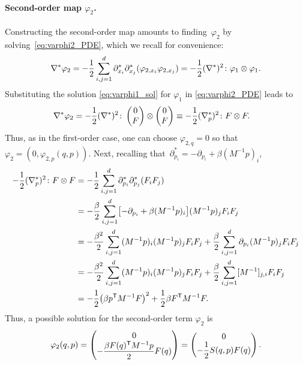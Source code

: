 \documentclass[11pt]{article}
\renewcommand{\t}{\mathsf T}
\DeclarePairedDelimiter\paren{\lparen}{\rparen}
\DeclarePairedDelimiter\bkt{\lbrack}{\rbrack}
\theoremstyle{definition}
\let\oldparagraph=\paragraph
\renewcommand\paragraph[1]{\oldparagraph{#1.}}
\begin{document}
\paragraph{Second-order map $\varphi_2$} Constructing the second-order map amounts to finding~$\varphi_2$ by solving~\eqref{eq:varphi2_PDE}, which we recall for convenience:
\begin{equation}
    \notag
	\nabla^*\varphi_2 = -\frac{1}{2}\sum_{i,j=1}^d \partial_{x_i}^*\partial_{x_j}^* (\varphi_{2,x_i}\varphi_{2,x_j}) = -\frac{1}{2}(\nabla^*)^2 \colon \varphi_1\otimes \varphi_1.
\end{equation}
Substituting the solution \eqref{eq:varphi1_sol} for $\varphi_1$ in \eqref{eq:varphi2_PDE} leads to
\begin{align}
    \notag
    \nabla^*\varphi_2 &= -\frac{1}{2}(\nabla^*)^2\colon 
    \begin{pmatrix}
        0 \\ F    
    \end{pmatrix} \otimes 
    \begin{pmatrix}
        0 \\ F    
    \end{pmatrix} \equiv -\frac{1}{2}(\nabla_p^*)^2 \colon F\otimes F.
\end{align}
Thus, as in the first-order case, one can choose $\varphi_{2,q} = 0$ so that $\varphi_2 = (0, \varphi_{2,p}(q,p))$. Next, recalling that~$\partial^*_{p_i} = -\partial_{p_i} + \beta (M^{-1}p)_i$,
\begin{align*}
    -\frac{1}{2}(\nabla_p^*)^2 \colon F\otimes F &= -\frac{1}{2}\sum_{i,j=1}^d \partial_{p_i}^*\partial_{p_j}^* \paren*{F_i F_j} \\
    &= -\frac{\beta}{2}\sum_{i,j=1}^d \bkt*{-\partial_{p_i} + \beta (M^{-1}p)_i}(M^{-1}p)_j F_i F_j \\
    &= -\frac{\beta^2}{2}\sum_{i,j=1}^d (M^{-1}p)_i(M^{-1}p)_j F_i F_j + \frac{\beta}{2} \sum_{i,j=1}^d \partial_{p_i}(M^{-1}p)_j F_iF_j \\
    &= -\frac{\beta^2}{2}\sum_{i,j=1}^d (M^{-1}p)_i(M^{-1}p)_j F_i F_j +\frac{\beta}{2}\sum_{i,j=1}^d [M^{-1}]_{j,i} F_i F_j \\
    &= -\frac{1}{2}\paren*{\beta p^\t M^{-1}F}^2 + \frac{1}{2}\beta F^\t M^{-1}F.
\end{align*}
Thus, a possible solution for the second-order term $\varphi_2$ is
\begin{equation}
    \notag
    \varphi_2(q,p) = 
    \begin{pmatrix}
        0 \\ -\dfrac{\beta F(q)^\t M^{-1} p}{2}F(q)
    \end{pmatrix} = 
    \begin{pmatrix}
        0 \\ -\dfrac{1}{2}S(q,p)F(q)
    \end{pmatrix}.
\end{equation}
\end{document}
